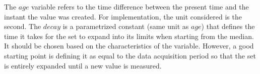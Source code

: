 The $age$ variable refers to the time difference between the present time and the instant the value was created. For implementation, the unit considered is the second. The $decay$ is a parametrized constant (same unit as $age$) that defines the time it takes for the set to expand into its limits when starting from the median. It should be chosen based on the characteristics of the variable. However, a good starting point is defining it as equal to the data acquisition period so that the set is entirely expanded until a new value is measured.

\begin{figure}[h!]
    \begin{floatrow}
    \end{floatrow}
    \end{figure}

